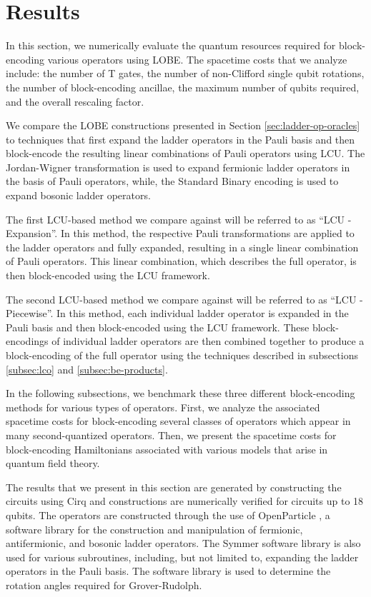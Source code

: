 \section{Results}
\label{sec:results}

In this section, we numerically evaluate the quantum resources required for block-encoding various operators using LOBE.
The spacetime costs that we analyze include: the number of T gates, the number of non-Clifford single qubit rotations, the number of block-encoding ancillae, the maximum number of qubits required, and the overall rescaling factor.

We compare the LOBE constructions presented in Section \ref{sec:ladder-op-oracles} to techniques that first expand the ladder operators in the Pauli basis and then block-encode the resulting linear combinations of Pauli operators using LCU.
The Jordan-Wigner transformation \cite{} is used to expand fermionic ladder operators in the basis of Pauli operators, while, the Standard Binary encoding \cite{} is used to expand bosonic ladder operators.

The first LCU-based method we compare against will be referred to as ``LCU - Expansion''.
In this method, the respective Pauli transformations are applied to the ladder operators and fully expanded, resulting in a single linear combination of Pauli operators.
This linear combination, which describes the full operator, is then block-encoded using the LCU framework.

The second LCU-based method we compare against will be referred to as ``LCU - Piecewise''.
In this method, each individual ladder operator is expanded in the Pauli basis and then block-encoded using the LCU framework.
These block-encodings of individual ladder operators are then combined together to produce a block-encoding of the full operator using the techniques described in subsections \ref{subsec:lco} and \ref{subsec:be-products}.

In the following subsections, we benchmark these three different block-encoding methods for various types of operators.
First, we analyze the associated spacetime costs for block-encoding several classes of operators which appear in many second-quantized operators.
Then, we present the spacetime costs for block-encoding Hamiltonians associated with various models that arise in quantum field theory.

The results that we present in this section are generated by constructing the circuits using Cirq \cite{cirq} and constructions are numerically verified for circuits up to 18 qubits.
The operators are constructed through the use of OpenParticle \cite{openparticle}, a software library for the construction and manipulation of fermionic, antifermionic, and bosonic ladder operators.
The Symmer software library \cite{} is also used for various subroutines, including, but not limited to, expanding the ladder operators in the Pauli basis.
The software library \cite{grover-rudolph-github} is used to determine the rotation angles required for Grover-Rudolph.

